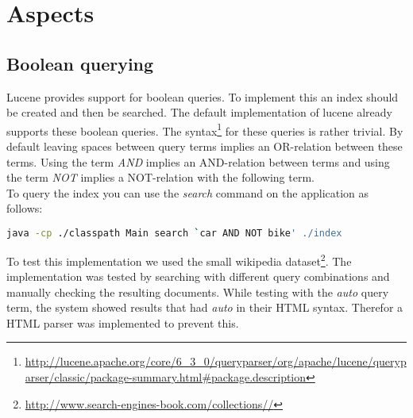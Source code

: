 \documentclass{article}
\begin{document}
\section{Aspects}
\subsection{Boolean querying}
Lucene provides support for boolean queries. To implement this an index should be created and then be searched. The default implementation of lucene already supports these boolean queries. The syntax\footnote{\url{http://lucene.apache.org/core/6_3_0/queryparser/org/apache/lucene/queryparser/classic/package-summary.html#package.description}} for these queries is rather trivial. By default leaving spaces between query terms implies an OR-relation between these terms. Using the term \emph{AND} implies an AND-relation between terms and using the term \emph{NOT} implies a NOT-relation with the following term.\\
To query the index you can use the \emph{search} command on the application as follows:
\begin{lstlisting}[language=Bash, label={lst:search}]
java -cp ./classpath Main search `car AND NOT bike' ./index
\end{lstlisting}
To test this implementation we used the small wikipedia dataset\footnote{\url{http://www.search-engines-book.com/collections//}}. The implementation was tested by searching with different query combinations and manually checking the resulting documents. While testing with the \emph{auto} query term, the system showed results that had \emph{auto} in their HTML syntax. Therefor a HTML parser was implemented to prevent this.
\end{document}

